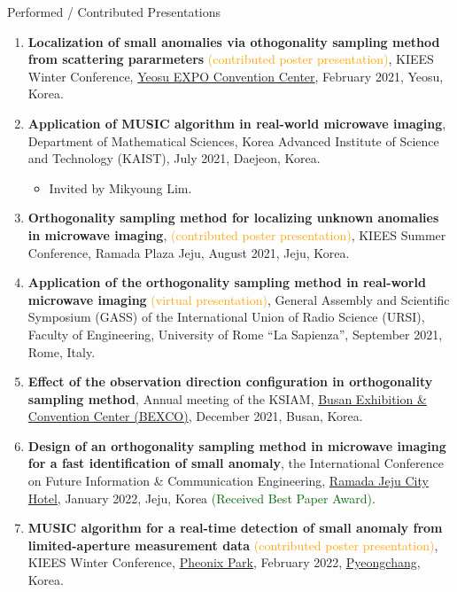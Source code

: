 \documentclass{resume} %
\begin{document}
\begin{rSection}{Performed / Contributed Presentations}
\begin{enumerate}
\item\label{P-KIEES2021A} \textbf{Localization of small anomalies via othogonality sampling method from scattering pararmeters} \textcolor{orange}{(contributed poster presentation)}, KIEES Winter Conference, \href{http://www.expo2012.kr/web/bbs/content.php?co_id=sub031}{Yeosu EXPO Convention Center}, February 2021, Yeosu, Korea.
\item\label{P-KAIST2021} \textbf{Application of MUSIC algorithm in real-world microwave imaging}, Department of Mathematical Sciences, Korea Advanced Institute of Science and Technology (KAIST), July 2021, Daejeon, Korea.
\begin{itemize}
\item Invited by Mikyoung Lim.
\end{itemize}
\item\label{P-KIEES2021B} \textbf{Orthogonality sampling method for localizing unknown anomalies in microwave imaging}, \textcolor{orange}{(contributed poster presentation)}, KIEES Summer Conference, Ramada Plaza Jeju, August 2021, Jeju, Korea.
\item\label{P-URSI2021} \textbf{Application of the orthogonality sampling method in real-world microwave imaging} \textcolor{orange}{(virtual presentation)},  General Assembly and Scientific Symposium (GASS) of the International Union of Radio Science (URSI), Faculty of Engineering, University of Rome ``La Sapienza'', September 2021, Rome, Italy.
\item\label{P-KSIAM2021} \textbf{Effect of the observation direction configuration in orthogonality sampling method}, Annual meeting of the KSIAM, \href{http://www.bexco.co.kr/eng/Main.do}{Busan Exhibition \& Convention Center (BEXCO)}, December 2021, Busan, Korea.
\item\label{P-ICFICE2022} \textbf{Design of an orthogonality sampling method in microwave imaging for a fast identification of small anomaly}, the  International Conference on Future Information \& Communication Engineering, \href{http://ramadajejucity.com/index_eng.php}{Ramada Jeju City Hotel}, January 2022, Jeju, Korea \textcolor{darkgreen}{(Received Best Paper Award)}.
\item\label{P-KIEES2022A} \textbf{MUSIC algorithm for a real-time detection of small anomaly from limited-aperture measurement data} \textcolor{orange}{(contributed poster presentation)}, KIEES Winter Conference, \href{https://phoenixhnr.co.kr/en/page/main/pyeongchang}{Pheonix Park}, February 2022, \href{http://eng.pc.go.kr/}{Pyeongchang}, Korea.

\end{enumerate}
\end{rSection}
\end{document}
